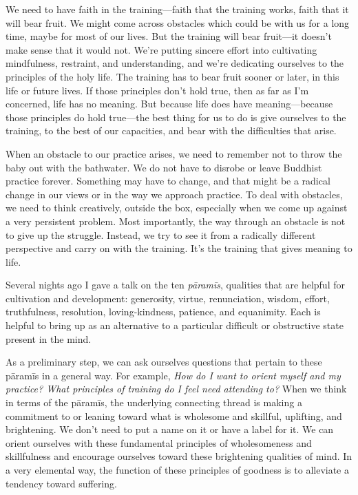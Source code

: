 We need to have faith in the training---faith that the training works, 
faith that it will bear fruit. We might come across obstacles which 
could be with us for a long time, maybe for most of our lives. But the 
training will bear fruit---it doesn't make sense that it would not. 
We're putting sincere effort into cultivating mindfulness, restraint, 
and understanding, and we're dedicating ourselves to the principles of 
the holy life. The training has to bear fruit sooner or later, in this 
life or future lives. If those principles don't hold true, then as far 
as I'm concerned, life has no meaning. But because life does have 
meaning---because those principles do hold true---the best thing for us 
to do is give ourselves to the training, to the best of our capacities, 
and bear with the difficulties that arise.

When an obstacle to our practice arises, we need to remember not to 
throw the baby out with the bathwater. We do not have to disrobe or 
leave Buddhist practice forever. Something may have to change, and that 
might be a radical change in our views or in the way we approach 
practice. To deal with obstacles, we need to think creatively, outside 
the box, especially when we come up against a very persistent problem. 
Most importantly, the way through an obstacle is not to give up the 
struggle. Instead, we try to see it from a radically different 
perspective and carry on with the training. It's the training that 
gives meaning to life.


Several nights ago I gave a talk on the ten \emph{pāramīs}, qualities 
that are helpful for cultivation and development: generosity, virtue, 
renunciation, wisdom, effort, truthfulness, resolution, 
loving-kindness, patience, and equanimity. Each is helpful to bring up 
as an alternative to a particular difficult or obstructive state 
present in the mind.

As a preliminary step, we can ask ourselves questions that pertain to 
these pāramīs in a general way. For example, \emph{How do I want to 
orient myself and my practice? What principles of training do I feel 
need attending to?} When we think in terms of the pāramīs, the 
underlying connecting thread is making a commitment to or leaning 
toward what is wholesome and skillful, uplifting, and brightening. We 
don't need to put a name on it or have a label for it. We can orient 
ourselves with these fundamental principles of wholesomeness and 
skillfulness and encourage ourselves toward these brightening qualities 
of mind. In a very elemental way, the function of these principles of 
goodness is to alleviate a tendency toward suffering.

